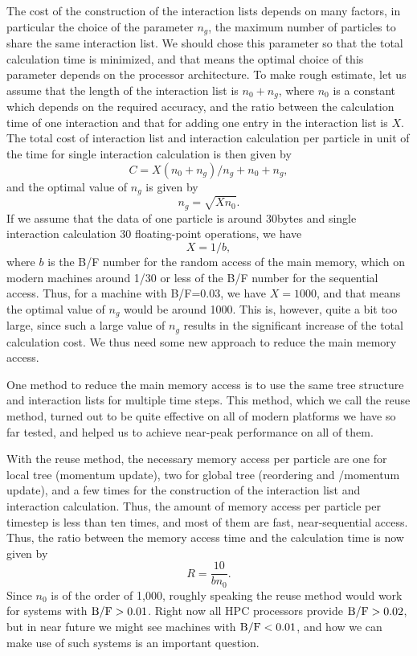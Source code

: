 The cost of the construction of the  interaction lists depends on many factors, in
particular the choice of the parameter $n_g$, the maximum number of
particles to share the same interaction list. We should
chose this parameter so that the total calculation time is minimized,
and that means the optimal choice of this parameter depends on the
processor architecture. To make rough estimate, let us assume that the
length of the interaction list is $n_{0}+n_g$, where $n_0$ is a constant
which depends on the required accuracy, and the ratio between
the calculation time of one interaction and that for adding one entry in the
interaction list is $X$. The total  cost of interaction list and
interaction calculation per particle in unit of the time for single
interaction calculation  is then given by
\begin{equation}
  C = X(n_{0}+n_g)/n_g + n_{0}+n_g,
\end{equation}
and the optimal value of $n_g$ is given by
\begin{equation}
 n_g = \sqrt{Xn_{0}}.
\end{equation}
If we assume that the data of one particle is around 30bytes and
single interaction calculation 30 floating-point operations,
we have
\begin{equation}
  X = 1/b,
\end{equation}
where $b$ is the B/F number  for the random access of the main memory, which on modern
machines around 1/30 or less of the B/F number for the sequential
access. Thus, for a machine with B/F=0.03, we have $X=1000$, and that
means the optimal value of $n_g$ would be around 1000. This is,
however, quite a bit too large, since such a large value of $n_g$
results in the significant increase of the total calculation cost. We thus
need some new approach to reduce the main memory access.

One method to reduce the main memory access is to use the same tree
structure and interaction lists for multiple time steps. This method,
which we call the reuse method, turned out to be quite effective on
all of modern platforms we have so far tested, and helped us to
achieve near-peak performance on all of them.

With the reuse method, the necessary  memory access per
particle are one for local tree (momentum update),
two for global tree (reordering and /momentum update),
and a few times for the construction of the interaction list and
interaction calculation. Thus, the amount of memory access per
particle per timestep is less than ten times, and most of them are
fast, near-sequential access. Thus, the ratio between the memory
access time and the calculation time is now given by
\begin{equation}
  R = \frac{10}{bn_0}.
\end{equation}
Since $n_0$ is of the order of 1,000, roughly speaking the reuse
method would work for systems with $\rm B/F > 0.01$.
Right now all HPC processors provide $\rm B/F > 0.02$, but in near
future we might see machines with $\rm B/F < 0.01$, and how we can
make use of such systems is an important question.

